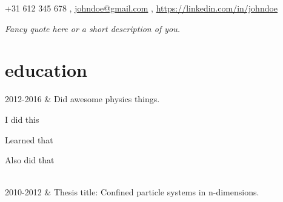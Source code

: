 \documentclass[]{cv-roald}
\begin{document}
\pagestyle{empty} %

{\faMobile \hspace{\FAspace} +31 612 345 678 \sep \faEnvelope \hspace{\FAspace} \href{mailto:johndoe@gmail.com}{johndoe@gmail.com} \sep \faLinkedinSquare \hspace{\FAspace} \href{https://linkedin.com/in/johndoe}{https://linkedin.com/in/johndoe}
}

\textit{Fancy quote here or a short description of you.}

\section*{education}
\begin{tabularcv}
    2012-2016   &   
                    \newline Did awesome physics things.
                    \begin{tabitemize}
                        \item I did this
                        \item Learned that
                        \item Also did that
                    \end{tabitemize}
                    \\[\vspacepar] %
    2010-2012   &   
                    \newline Thesis title: Confined particle systems in n-dimensions.
\end{tabularcv}
\end{document}
